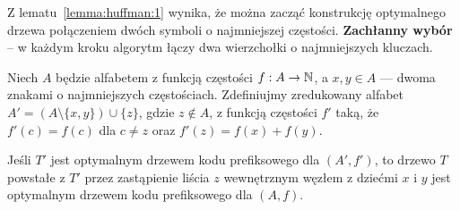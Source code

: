 Z lematu~\ref{lemma:huffman:1} wynika, że można zacząć konstrukcję optymalnego drzewa połączeniem dwóch symboli o najmniejszej częstości.
\textbf{Zachłanny wybór} -- w każdym kroku algorytm łączy dwa wierzchołki o najmniejszych kluczach.

\begin{lemma} \label{lemma:huffman:2}
	Niech $A$ będzie alfabetem z funkcją częstości $f: A \to \mathbb{N}$, a $x, y \in A$ — dwoma znakami o najmniejszych częstościach. Zdefiniujmy zredukowany alfabet $A' = (A \setminus \{x, y\}) \cup \{z\}$, gdzie $z \notin A$, z funkcją częstości $f'$ taką, że $f'(c) = f(c)$ dla $c \neq z$ oraz $f'(z) = f(x) + f(y)$.

	Jeśli $T'$ jest optymalnym drzewem kodu prefiksowego dla $(A', f')$, to drzewo $T$ powstałe z $T'$ przez zastąpienie liścia $z$ wewnętrznym węzłem z dziećmi $x$ i $y$ jest optymalnym drzewem kodu prefiksowego dla $(A, f)$.
\end{lemma}

\begin{center}
\end{center}

